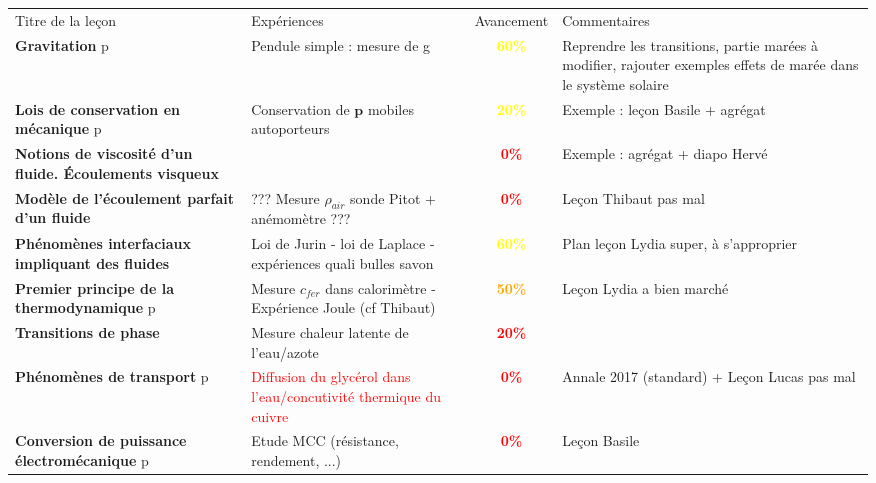\begin{changemargin}{-1.5cm}{-0cm}

\begin{center}
\begin{tabularx}{\paperwidth-2cm}{| X | X | c | X |}
  \hline
  \rowcolor{gray!20}\multicolumn{4}{c}{Avancement préparation oraux Leçons Physique} \\
  \hline 
  Titre de la leçon & Expériences & Avancement & Commentaires \\
  \hline
\textbf{Gravitation} p\pageref{LP_Gravitation}  & Pendule simple : mesure de g & \textcolor{yellow}{\textbf{60\%}}  & Reprendre les transitions, partie marées à modifier, rajouter exemples effets de marée dans le système solaire   \\
  \hline 
  \hline
     \textbf{Lois de conservation en mécanique} p\pageref{LP_LoisConservation} & Conservation de $\mathbf{p}$ mobiles autoporteurs  &  \textcolor{yellow}{\textbf{20\%}}  & Exemple : leçon Basile + agrégat \\
  \hline 
    \textbf{Notions de viscosité d'un fluide. \'{E}coulements visqueux} &  & \textcolor{red}{\textbf{0\%}} &  Exemple : agrégat + diapo Hervé   \\
  \hline 
  \textbf{Modèle de l'écoulement parfait d'un fluide} & ??? Mesure $\rho_{air}$ sonde Pitot + anémomètre ???  & \textcolor{red}{\textbf{0\%}} & Leçon Thibaut pas mal \\
  \hline
  \textbf{Phénomènes interfaciaux impliquant des fluides} & Loi de Jurin - loi de Laplace - expériences quali bulles savon & \textcolor{yellow}{\textbf{60\%}} & Plan leçon Lydia super, à s'approprier\\
  \hline 
  \hline
  \textbf{Premier principe de la thermodynamique} p\pageref{LP_PremierPrincipe} & Mesure $c_{fer}$ dans calorimètre - Expérience Joule (cf Thibaut) & \textcolor{orange}{\textbf{50\%}} & Leçon Lydia a bien marché \\
  \hline 
  \textbf{Transitions de phase} & Mesure chaleur latente de l'eau/azote & \textcolor{red}{\textbf{20\%}} & \\
  \hline 
  \textbf{Phénomènes de transport} p\pageref{LP_Transport} & \textcolor{red}{Diffusion du glycérol dans l'eau/concutivité thermique du cuivre}& \textcolor{red}{\textbf{0\%}} & Annale 2017 (standard) + Leçon Lucas pas mal\\
  \hline 
  \hline
  \textbf{Conversion de puissance électromécanique} p\pageref{LP_ConversionPuissance} & Etude MCC (résistance, rendement, ...) & \textcolor{red}{\textbf{0\%}} & Leçon Basile\\

\end{tabularx}
\end{center}
\end{changemargin}
